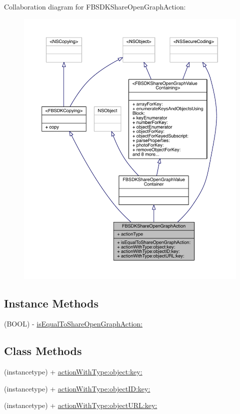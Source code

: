 Collaboration diagram for F\-B\-S\-D\-K\-Share\-Open\-Graph\-Action\-:
\nopagebreak
\begin{figure}[H]
\begin{center}
\leavevmode
\includegraphics[width=350pt]{interface_f_b_s_d_k_share_open_graph_action__coll__graph}
\end{center}
\end{figure}
\subsection*{Instance Methods}
\begin{DoxyCompactItemize}
\item 
(B\-O\-O\-L) -\/ \hyperlink{interface_f_b_s_d_k_share_open_graph_action_a5927f05c6d91d933508f7b9ce73d3edf}{is\-Equal\-To\-Share\-Open\-Graph\-Action\-:}
\end{DoxyCompactItemize}
\subsection*{Class Methods}
\begin{DoxyCompactItemize}
\item 
(instancetype) + \hyperlink{interface_f_b_s_d_k_share_open_graph_action_ad1563adbca5b35071c7605db39881d03}{action\-With\-Type\-:object\-:key\-:}
\item 
(instancetype) + \hyperlink{interface_f_b_s_d_k_share_open_graph_action_ab6a9ba11f94fa3d7e6e7632d6d36e068}{action\-With\-Type\-:object\-I\-D\-:key\-:}
\item 
(instancetype) + \hyperlink{interface_f_b_s_d_k_share_open_graph_action_a9519ca50317dad9cfa84160714051630}{action\-With\-Type\-:object\-U\-R\-L\-:key\-:}
\end{DoxyCompactItemize}
